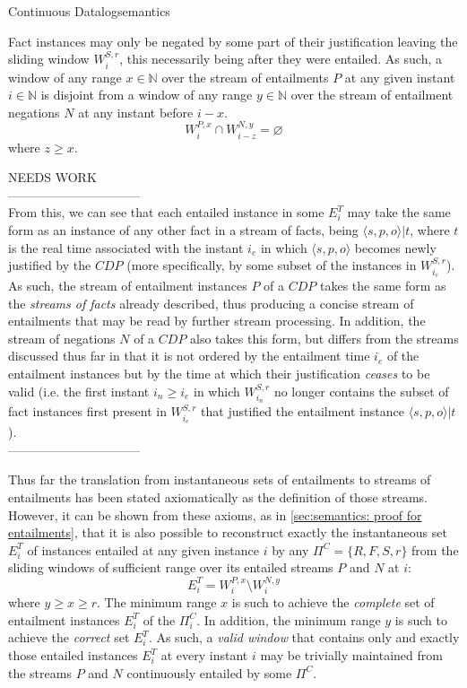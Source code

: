 \begin{nestedsection}{Continuous Datalog}{semantics}
\begin{axiom}
\label{axiom:continuous datalog: entailment precedes negation}
Fact instances may only be negated by some part of their justification leaving
the sliding window $W^{S,r}_{i}$, this necessarily being after they
were entailed.  As such, a window of any range ${x \in \mathbb{N}}$
over the stream of entailments $P$ at any given instant ${i \in \mathbb{N}}$
is disjoint from a window of any range ${y \in \mathbb{N}}$ over the
stream of entailment negations $N$ at any instant before ${i - x}$.
\begin{equation*}
W^{P,x}_{i} \cap W^{N,y}_{i-z} = \varnothing
\end{equation*}
where $z \geq x$.
\end{axiom}

NEEDS WORK\\
--------------------------------\\
From this, we can see that each entailed instance in some
$E^T_{i}$ may take the same form as an instance of any other fact in a
stream of facts, being $\langle s, p, o \rangle | t$, where $t$ is
the real time associated with the instant $i_{e}$ in which
$\langle s, p, o \rangle$ becomes newly justified by the ${CDP}$ (more
specifically, by some subset of the instances in $W^{S,r}_{i_{e}}$).
As such, the stream of entailment instances $P$ of a ${CDP}$ takes
the same form as the \emph{streams of facts} already described, thus
producing a concise stream of entailments that may be read by
further stream processing.  In addition, the stream of negations $N$
of a ${CDP}$ also takes this form, but differs from the streams
discussed thus far in that it is not ordered by the entailment time
$i_{e}$ of the entailment instances but by the time at which their
justification \emph{ceases} to be valid (i.e. the first instant
${i_{n} \geq i_{e}}$ in which $W^{S,r}_{i_{n}}$ no longer contains
the subset of fact instances first present in $W^{S,r}_{i_{e}}$ that
justified the entailment instance $\langle s, p, o \rangle | t$).
\\--------------------------------

Thus far the translation from instantaneous sets of entailments to
streams of entailments has been stated axiomatically as the definition
of those streams.  However, it can be shown from these axioms, as in
\ref{sec:semantics: proof for entailments}, that it is also possible
to reconstruct exactly the instantaneous set $E^T_{i}$ of instances
entailed at any given instance $i$ by any $\Pi^C = \{ R, F, S, r \}$
from the sliding windows of sufficient range over its entailed streams
$P$ and $N$ at $i$:
\[ E^T_{i} = W^{P,x}_{i} \setminus W^{N,y}_{i} \]
where ${y \geq x \geq r}$. The minimum range $x$ is such to achieve
the \emph{complete} set of entailment instances $E^T_{i}$ of the
$\Pi^C_{i}$. In addition, the minimum range $y$ is such to achieve the
\emph{correct} set $E^T_{i}$. As such, a \emph{valid window} that
contains only and exactly those entailed instances $E^T_{i}$ at every
instant $i$ may be trivially maintained from the streams $P$ and $N$
continuously entailed by some $\Pi^C$.
\end{nestedsection}
